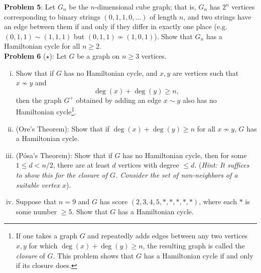 \documentclass{amsart}
\begin{document}
	\noindent \textbf{Problem 5}: Let $G_n$ be the $n$-dimensional cube graph; that is, $G_n$ has $2^n$ vertices corresponding to binary strings $(0,1,1,0,\dots)$ of length $n$, and two strings have an edge between them if and only if they differ in exactly one place (e.g. $(0,1,1)\sim (1,1,1)$ but $(0,1,1)\not\sim (1,0,1)$). Show that $G_n$ has a Hamiltonian cycle for all $n\geq 2$.\\
	
\noindent \textbf{Problem 6} ($\star$): Let $G$ be a graph on $n\geq 3$ vertices.
\begin{enumerate}[(i)]
	\item Show that if $G$ has no Hamiltonian cycle, and $x,y$ are vertices such that $x\not\sim y$ and
	$$
	\deg(x)+\deg(y)\geq n,
	$$
	then the graph $G^+$ obtained by adding an edge $x\sim y$ also has no Hamiltonian cycle\footnote{If one takes a graph $G$ and repeatedly adds edges between any two vertices $x,y$ for which $\deg(x)+\deg(y)\geq n$, the resulting graph is called the \textit{closure} of $G$. This problem shows that $G$ has a Hamiltonian cycle if and only if its closure does.}.
	\item (Ore's Theorem): Show that if $\deg(x)+\deg(y)\geq n$ for all $x\not\sim y$, $G$ has a Hamiltonian cycle.
	\item (P\'osa's Theorem): Show that if $G$ has no Hamiltonian cycle, then for some $1\leq d<n/2$, there are at least $d$ vertices with degree $\leq d$. (\textit{Hint: It suffices to show this for the closure of $G$. Consider the set of non-neighbors of a suitable vertex $x$}).
	\item Suppose that $n=9$ and $G$ has score $(2,3,4,5,\ast,\ast,\ast,\ast,\ast)$, where each $\ast$ is some number $\geq 5$. Show that $G$ has a Hamiltonian cycle.\\
\end{enumerate}
	
	
\end{document}
